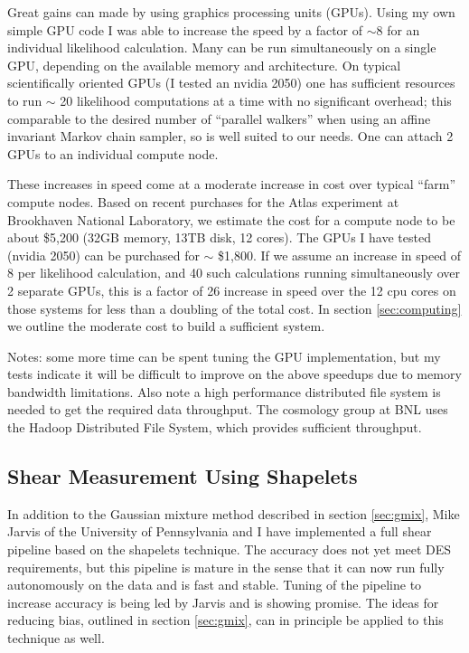 \documentclass[12pt]{article}
\begin{document}
Great gains can made by using graphics processing units (GPUs).  Using my own
simple GPU code I was able to increase the speed by a factor of $\sim 8$ for an
individual likelihood calculation. Many can be run simultaneously on a single
GPU, depending on the available memory and architecture.  On typical
scientifically oriented GPUs (I tested an nvidia 2050) one has sufficient
resources to run $\sim$ 20 likelihood computations at a time with no
significant overhead; this comparable to the desired number of ``parallel
walkers'' when using an affine invariant Markov chain sampler, so is well
suited to our needs.  One can attach 2 GPUs to an individual compute node.

These increases in speed come at a moderate increase in cost over typical
``farm'' compute nodes.  Based on recent purchases for the Atlas experiment at
Brookhaven National Laboratory, we estimate the cost for a compute node to be
about \$5,200 (32GB memory, 13TB disk, 12 cores).  The GPUs I have tested
(nvidia 2050) can be purchased for $\sim$ \$1,800.  If we assume an increase in
speed of 8 per likelihood calculation, and 40 such calculations running
simultaneously over 2 separate GPUs, this is a factor of 26 increase in speed
over the 12 cpu cores on those systems for less than a doubling of the total
cost.  In section \ref{sec:computing} we outline the moderate cost to build a
sufficient system.

Notes: some more time can be spent tuning the GPU implementation, but my tests
indicate it will be difficult to improve on the above speedups due to memory
bandwidth limitations.  Also note a high performance distributed file system is
needed to get the required data throughput.  The cosmology group at BNL uses
the Hadoop Distributed File System, which provides sufficient throughput.


\subsection{Shear Measurement Using Shapelets}
\label{sec:shapelets}

In addition to the Gaussian mixture method described in section \ref{sec:gmix},
Mike Jarvis of the University of Pennsylvania and I have implemented a full
shear pipeline based on the shapelets technique\cite{Bern02}.   The accuracy
does not yet meet DES requirements, but this pipeline is mature in the sense
that it can now run fully autonomously on the data and is fast and stable.
Tuning of the pipeline to increase accuracy is being led by Jarvis and is
showing promise.   The ideas for reducing bias, outlined in section
\ref{sec:gmix}, can in principle be applied to this technique as well.
\end{document}
